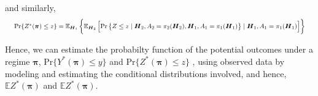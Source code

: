 \documentclass{article}
\newcommand{\bs}{ \boldsymbol}
\newcommand{\mb}{\mathbb}
\newcommand{\lt}{\left}
\newcommand{\rt}{\right}
\begin{document}
and similarly, 
\begin{equation*}
\resizebox{\textwidth}{!}{
$\text{Pr}\{ Z^*(\bs{\pi}) \le z\} =  \mb{E}_{\bs{H}_1} \lt\{ \mb{E}_{\bs{H}_2}\lt[  \text{Pr}\lt\{Z \le z \mid \bs{H}_2 , A_2 = \pi_2(\bs{H}_2), \bs{H}_1 , A_1 = \pi_1(\bs{H}_1)\rt\}  \mid \bs{H}_1, A_1 = \pi_1(\bs{H}_1) \rt] \rt\}$
}
\end{equation*}




Hence, we can estimate the probabilty function of the potential outcomes under a regime $\bs{\pi}$, $\text{Pr}\{ Y^*(\bs{\pi}) \le y\}$ and $\text{Pr}\{ Z^*(\bs{\pi}) \le z\}$  , using observed data by modeling and estimating the conditional distributions involved, and hence, $\mb{E}Z^*(\bs{\pi})$ and $\mb{E}Z^*(\bs{\pi})$.\\
\end{document}
